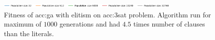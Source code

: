 \begin{figure}[ht!]
    \begin{minipage}{\textwidth}
        \centering
        \includegraphics[width=0.8\textwidth]{img/runs/fitness_ga_3SAT_legend.pdf}
    \end{minipage}

    \caption[Fitness of genetic algorithm with elitism]{Fitness of \acrlong{acc:ga} with elitism on \acrshort{acc:3sat} problem. Algorithm run for maximum of $1000$ generations and had $4.5$ times number of clauses than the literals.}
\end{figure}






